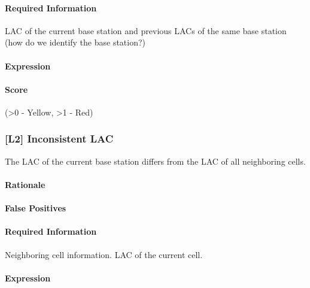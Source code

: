 \documentclass[a4paper,11pt,notitlepage,bigheadings,oneside]{scrartcl}
\begin{document}
\TBD{}

\paragraph{Required Information}

\TBD{}

LAC of the current base station and previous LACs of the same base station (how do we identify the base station?)

\paragraph{Expression}

\TBD{}

\paragraph{Score}

\TBD{} (\textgreater 0 - Yellow, \textgreater 1 - Red)

\subsubsection{[L2] Inconsistent LAC}

The LAC of the current base station differs from the LAC of all neighboring cells.


\paragraph{Rationale}

\TBD{}

\paragraph{False Positives}

\TBD{}

\paragraph{Required Information}

Neighboring cell information. LAC of the current cell.

\paragraph{Expression}
\end{document}
